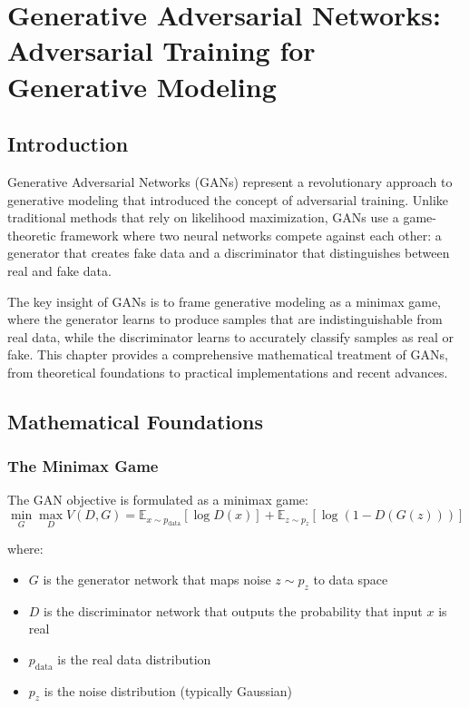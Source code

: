 \chapter[Generative Adversarial Networks]{Generative Adversarial Networks:\\Adversarial Training for Generative Modeling}

\section{Introduction}

Generative Adversarial Networks (GANs) represent a revolutionary approach to generative modeling that introduced the concept of adversarial training. Unlike traditional methods that rely on likelihood maximization, GANs use a game-theoretic framework where two neural networks compete against each other: a generator that creates fake data and a discriminator that distinguishes between real and fake data.

The key insight of GANs is to frame generative modeling as a minimax game, where the generator learns to produce samples that are indistinguishable from real data, while the discriminator learns to accurately classify samples as real or fake. This chapter provides a comprehensive mathematical treatment of GANs, from theoretical foundations to practical implementations and recent advances.

\section{Mathematical Foundations}

\subsection{The Minimax Game}

The GAN objective is formulated as a minimax game:
\begin{equation}
    \min_G \max_D V(D, G) = \mathbb{E}_{x \sim p_{\text{data}}}[\log D(x)] + \mathbb{E}_{z \sim p_z}[\log(1 - D(G(z)))]
\end{equation}

where:
\begin{itemize}
    \item $G$ is the generator network that maps noise $z \sim p_z$ to data space
    \item $D$ is the discriminator network that outputs the probability that input $x$ is real
    \item $p_{\text{data}}$ is the real data distribution
    \item $p_z$ is the noise distribution (typically Gaussian)
\end{itemize}

